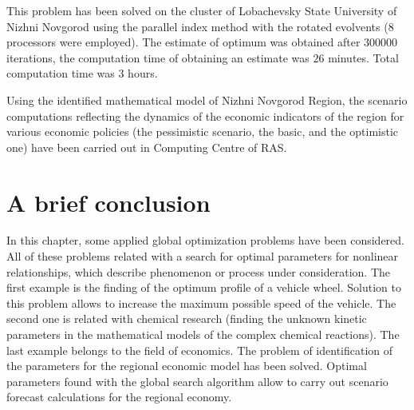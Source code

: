 This problem has been solved on the cluster of Lobachevsky State University of Nizhni Novgorod using the parallel index method with the rotated evolvents (8 processors were employed). The estimate of optimum was obtained after $300 000$ iterations, the computation time of obtaining an estimate was $26$ minutes. Total computation time was $3$ hours.

Using the identified mathematical model of Nizhni Novgorod Region, the scenario computations reflecting the dynamics of the economic indicators of the region for various economic policies (the pessimistic scenario, the basic, and the optimistic one) have been carried out in Computing Centre of RAS.

\section*{A brief conclusion}

In this chapter, some applied global optimization problems have been considered. All of these problems related with a search for optimal parameters for nonlinear relationships, which describe phenomenon or process under consideration. The first example is the finding of the optimum profile of a vehicle wheel. Solution to this problem allows to increase the maximum possible speed of the vehicle. The second one is related with chemical research (finding the unknown kinetic parameters in the mathematical models of the complex chemical reactions). The last example belongs to the field of economics. The problem of identification of the parameters for the regional economic model has been solved. Optimal parameters found with the global search algorithm allow to carry out scenario forecast calculations for the regional economy.

